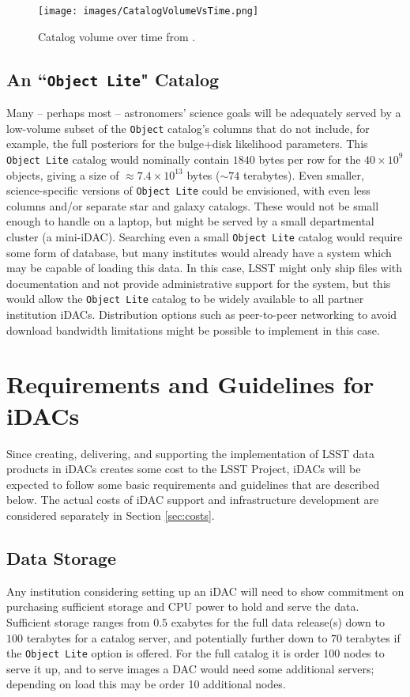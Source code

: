 \begin{figure}
\begin{center}
\texttt{[image: images/CatalogVolumeVsTime.png]}
\caption{Catalog volume over time from . \label{fig:catvol}}
\end{center}
\end{figure}

\subsection{An ``{\tt Object Lite}" Catalog}

Many -- perhaps most -- astronomers' science goals will be adequately served by a low-volume subset of the {\tt Object} catalog's columns that do not include, for example, the full posteriors for the bulge+disk likelihood parameters. This {\tt Object Lite} catalog would nominally contain $1840$ bytes per row for the $40 \times 10^{9}$ objects, giving a size of $\approx 7.4 \times 10^{13}$ bytes ($\sim74$ terabytes). Even smaller, science-specific versions of {\tt Object Lite} could be envisioned, with even less columns and/or separate star and galaxy catalogs. These would not be small enough to handle on a laptop, but might be served by a small departmental cluster (a mini-iDAC). Searching even a small {\tt Object Lite} catalog would require some form of database, but many institutes would already have a system which may be capable of loading this data. In this case, LSST might only ship files with documentation and not provide administrative support for the system, but this would allow the {\tt Object Lite} catalog to be widely available to all partner institution iDACs. Distribution options such as peer-to-peer networking to avoid download bandwidth limitations might be possible to implement in this case.

\section{Requirements and Guidelines for iDACs}\label{sec:reqs}

Since creating, delivering, and supporting the implementation of LSST data products in iDACs creates some cost to the LSST Project, iDACs will be expected to follow some basic requirements and guidelines that are described below. The actual costs of iDAC support and infrastructure development are considered separately in Section \ref{sec:costs}.

\subsection{Data Storage}
Any institution considering setting up an iDAC will need to show commitment on purchasing sufficient storage and CPU power to hold and serve the data. Sufficient storage ranges from $0.5$ exabytes for the full data release(s) down to $100$ terabytes for a catalog server, and potentially further down to $70$ terabytes if the {\tt Object Lite} option is offered. For the full catalog it is order 100 nodes to serve it up, and to serve images a DAC would need some additional servers; depending on load this may be order 10 additional nodes.


